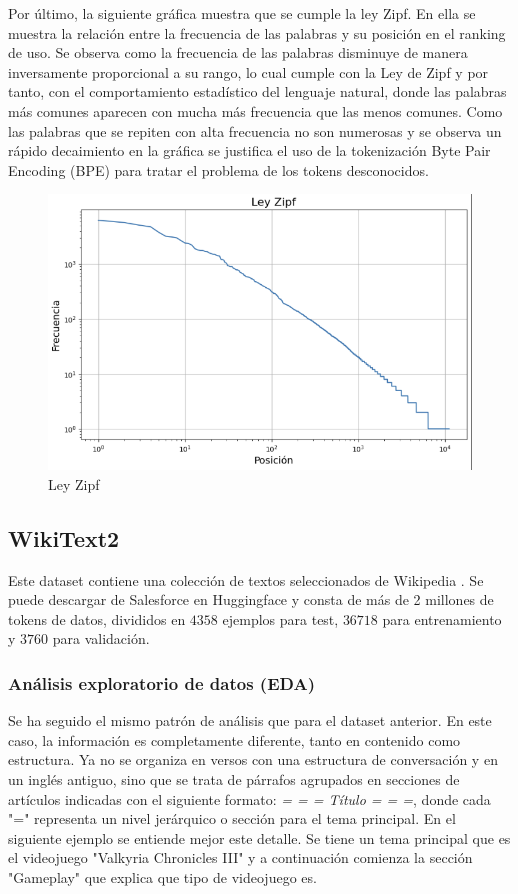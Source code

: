 \documentclass[11pt]{book}
\begin{document}
Por último, la siguiente gráfica muestra que se cumple la ley Zipf. En ella se muestra la relación entre la frecuencia de las palabras y su posición en el ranking de uso. Se observa como la frecuencia de las palabras disminuye de manera inversamente proporcional a su rango, lo cual cumple con la Ley de Zipf y por tanto, con el comportamiento estadístico del lenguaje natural, donde las palabras más comunes aparecen con mucha más frecuencia que las menos comunes. Como las palabras que se repiten con alta frecuencia no son numerosas y se observa un rápido decaimiento en la gráfica se justifica el uso de la tokenización Byte Pair Encoding (BPE) para tratar el problema de los tokens desconocidos.


\begin{figure}[h]
    \centering
    \includegraphics[width=0.5\linewidth]{img/zipf_shake.png}
    \caption{Ley Zipf}
    \label{fig:placeholder37}
\end{figure}

\subsection{WikiText2}
Este dataset contiene una colección de textos seleccionados de Wikipedia \parencite{huggingface_wikitext} \parencite{autonlp2020linkedwikitext}. Se puede descargar de Salesforce en Huggingface y consta de más de 2 millones de tokens de datos, divididos en $4358$ ejemplos para test, $36718$ para entrenamiento y $3760$ para validación. 

\subsubsection{Análisis exploratorio de datos (EDA)}

Se ha seguido el mismo patrón de análisis que para el dataset anterior. En este caso, la información es completamente diferente, tanto en contenido como estructura. Ya no se organiza en versos con una estructura de conversación y en un inglés antiguo, sino que se trata de párrafos agrupados en secciones de artículos indicadas con el siguiente formato: \textit{= = = Título = = =}, donde cada "=" representa un nivel jerárquico o sección para el tema principal. En el siguiente ejemplo se entiende mejor este detalle. Se tiene un tema principal que es el videojuego "Valkyria Chronicles III" y a continuación comienza la sección "Gameplay" que explica que tipo de videojuego es. 
\end{document}
